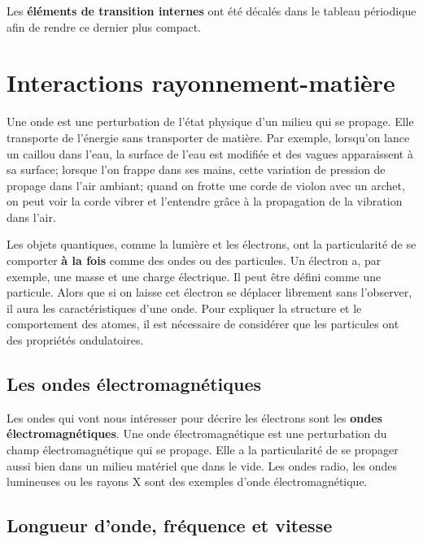 \documentclass[
  11pt,
  a4paper,
  openany]{book}
\begin{document}
Les \textbf{éléments de transition internes} ont été décalés dans le tableau périodique afin de rendre ce dernier plus compact.

\hypertarget{interactions-rayonnement-matiuxe8re}{%
\section{Interactions rayonnement-matière}\label{interactions-rayonnement-matiuxe8re}}

Une onde est une perturbation de l'état physique d'un milieu qui se propage. Elle transporte de l'énergie sans transporter de matière. Par exemple, lorsqu'on lance un caillou dans l'eau, la surface de l'eau est modifiée et des vagues apparaissent à sa surface; lorsque l'on frappe dans ses mains, cette variation de pression de propage dans l'air ambiant; quand on frotte une corde de violon avec un archet, on peut voir la corde vibrer et l'entendre grâce à la propagation de la vibration dans l'air.

Les objets quantiques, comme la lumière et les électrons, ont la particularité de se comporter \textbf{à la fois} comme des ondes ou des particules. Un électron a, par exemple, une masse et une charge électrique. Il peut être défini comme une particule. Alors que si on laisse cet électron se déplacer librement sans l'observer, il aura les caractéristiques d'une onde. Pour expliquer la structure et le comportement des atomes, il est nécessaire de considérer que les particules ont des propriétés ondulatoires.

\hypertarget{les-ondes-uxe9lectromagnuxe9tiques}{%
\subsection{Les ondes électromagnétiques}\label{les-ondes-uxe9lectromagnuxe9tiques}}

Les ondes qui vont nous intéresser pour décrire les électrons sont les \textbf{ondes électromagnétiques}. Une onde électromagnétique est une perturbation du champ électromagnétique qui se propage. Elle a la particularité de se propager aussi bien dans un milieu matériel que dans le vide. Les ondes radio, les ondes lumineuses ou les rayons X sont des exemples d'onde électromagnétique.

\hypertarget{longueur-donde-fruxe9quence-et-vitesse}{%
\subsection{Longueur d'onde, fréquence et vitesse}\label{longueur-donde-fruxe9quence-et-vitesse}}
\end{document}
